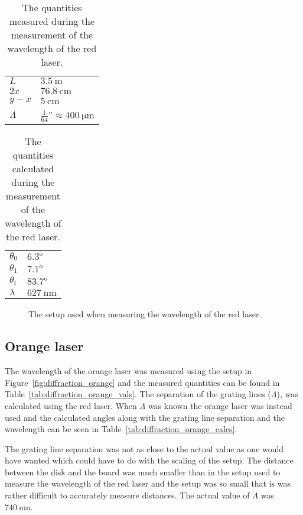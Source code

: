 \documentclass[12pt,a4paper]{article}
\begin{document}
\begin{table}
  \centering
  \begin{tabular}{|l|l|}\hline
    $L$ & $\SI{3.5}{\metre}$ \\
    $2x$ & $\SI{76.8}{\centi\metre}$ \\
    $y-x$ & $\SI{5}{\centi\metre}$ \\ 
    $\Lambda$ & $\frac{1}{64}$''$\approx\SI{400}{\micro\metre}$ \\ \hline
  \end{tabular}
  \caption{The quantities measured during the measurement of the wavelength of the red laser.}
  \label{tab:diffraction_red_vals}
\end{table}
\begin{table}
  \centering
  \begin{tabular}{|l|l|}\hline
    $\theta_0$ & $6.3^\text{o}$ \\
    $\theta_1$ & $7.1^\text{o}$ \\
    $\theta_i$ & $83.7^\text{o}$ \\
    $\lambda$ & $\SI{627}{\nano\metre}$ \\ \hline
  \end{tabular}
  \caption{The quantities calculated during the measurement of the wavelength of the red laser.}
  \label{tab:diffraction_red_calcs}
\end{table}
\begin{figure}[h]
  \centering
  \noindent\makebox[\textwidth]{\scalebox{0.80}{}}
  \caption{The setup used when measuring the wavelength of the red laser.}
  \label{fig:diffraction_red}
\end{figure}
\subsection{Orange laser}
The wavelength of the orange laser was measured using the setup in Figure~\ref{fig:diffraction_orange} and the measured quantities can be found in Table~\ref{tab:diffraction_orange_vals}. The separation of the grating lines ($\Lambda$), was calculated using the red laser. When $\Lambda$ was known the orange laser was instead used and the calculated angles along with the grating line separation and the wavelength can be seen in Table~\ref{tab:diffraction_orange_calcs}.

The grating line separation was not as close to the actual value as one would have wanted which could have to do with the scaling of the setup. The distance between the disk and the board was much smaller than in the setup used to measure the wavelength of the red laser and the setup was so small that is was rather difficult to accurately measure distances. The actual value of $\Lambda$ was $\SI{740}{\nano\metre}$.
\end{document}
